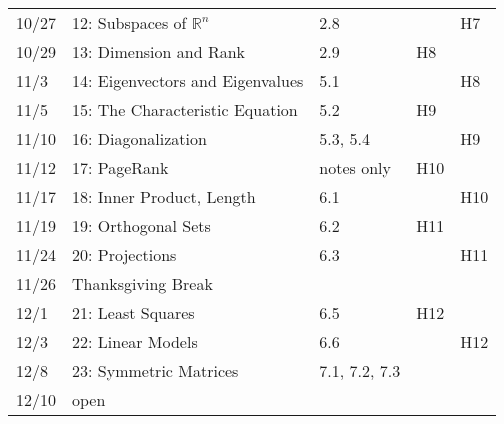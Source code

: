 \documentclass[11pt]{article}
\begin{document}
\begin{centering}
\begin{tabular}{||l|p{3in}|l|l|l||}
10/27 & 12: Subspaces of $\mathbb{R}^n$ & 2.8 & & H7\\ 
10/29 & 13: Dimension and Rank & 2.9 & H8 &\\ 
\hline

11/3 & 14: Eigenvectors and Eigenvalues & 5.1 &  & H8\\ 
11/5 & 15: The Characteristic Equation & 5.2 & H9 &\\ 
\hline

11/10 & 16: Diagonalization & 5.3, 5.4 & & H9\\ 
11/12 & 17: PageRank & notes only & H10 &\\  %
\hline

11/17 & 18: Inner Product, Length & 6.1 & & H10\\
11/19 & 19: Orthogonal Sets & 6.2 & H11 &\\ 
 \hline

11/24 & 20: Projections & 6.3 & & H11\\ 
11/26 & Thanksgiving Break &&&\\
\hline 

12/1 & 21: Least Squares & 6.5 & H12 & \\
12/3 & 22: Linear Models & 6.6 & & H12\\ 
\hline  
 12/8 & 23: Symmetric Matrices & 7.1, 7.2, 7.3 &  &\\ 
12/10 & open &  &  &\\ 
\hline\hline


\end{tabular}\\
\end{centering}
\end{document}
